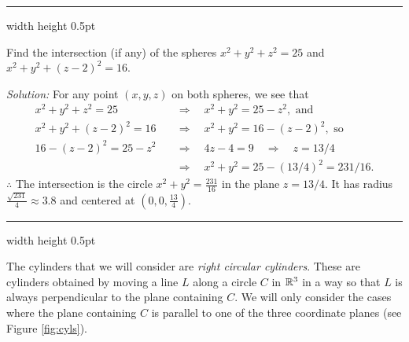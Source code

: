 \vspace{2mm}
\hrule width \textwidth height 0.5pt
\begin{exmp}\label{exmp:spheresphere}
 Find the intersection (if any) of the spheres $x^2 + y^2 + z^2 = 25$ and $x^2 + y^2 + (z - 2)^2 = 16$.\vspace{1mm}
 \par\noindent\emph{Solution:} For any point $(x,y,z)$ on both spheres, we see that
 \begin{align*}
  x^2 + y^2 + z^2 = 25 \quad &\Rightarrow \quad x^2 + y^2 = 25 -  z^2, \text{~and}\\
  x^2 + y^2 + (z - 2)^2 = 16 \quad &\Rightarrow \quad x^2 + y^2 = 16 - (z - 2)^2, \text{~so}\\
  16 - (z - 2)^2 = 25 -  z^2 \quad &\Rightarrow \quad  4z - 4 = 9 \quad
  \Rightarrow \quad z = 13/4\\
  &\Rightarrow \quad  x^2 + y^2 = 25 -  (13/4)^2 = 231/16.
 \end{align*}
 $\therefore$ 
 The intersection is the circle $x^2 + y^2 = \frac{231}{16}$ in the plane $z=13/4$. It has radius $\frac{\sqrt{231}}{4} \approx 3.8$ and
 centered at $(0,0,\frac{13}{4})$.
\end{exmp}
\hrule width \textwidth height 0.5pt
\vspace{2mm}

The cylinders that we will consider are \emph{right circular cylinders}. These are
cylinders obtained by moving a line $L$ along a circle $C$ in
$\mathbb{R}^{3}$ in a way so that $L$ is always perpendicular to the plane containing $C$. We will only
consider the cases where the plane containing $C$ is parallel to one of the three coordinate
planes (see Figure \ref{fig:cyls}).

